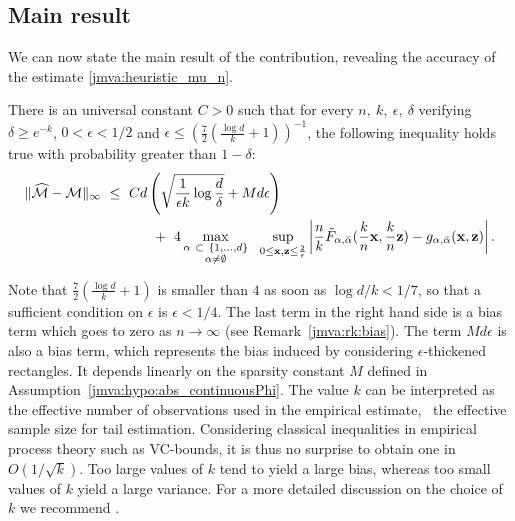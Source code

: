 \subsection{Main result}
We can now state the main result of the contribution, revealing the accuracy of the estimate \eqref{jmva:heuristic_mu_n}.
\begin{theorem}
\label{jmva:thm-princ}
There is an universal constant $C>0$ such that for every $n,~k,~\epsilon,~\delta$ verifying $\delta \ge e^{-k}$, $0 < \epsilon < 1/2$ and $ \epsilon \le (\frac{7}{2}(\frac{\log d}{k} + 1))^{-1}$,
the following inequality holds true with probability greater than $1-\delta$:
\begin{align*}
 \|\widehat{\mathcal{M}} - \cal{M}\|_\infty 
&~\le~  C d \left( \sqrt{ \frac{1}{\epsilon k}\log\frac{d}{\delta}} + M d\epsilon \right) \\
&~~~~~~~~~~~+~ 4 \max_{\substack{\alpha ~\subset~ \{1,\ldots,d\}\\ \alpha \neq \emptyset}}~~\sup_{0 \le \mathbf x, \mathbf z \le \frac{2 }{\epsilon}}\left|\frac{n}{k} \tilde F_{\alpha, \bar \alpha }( \frac{k}{n} \mathbf x, \frac{k}{n} \mathbf z)- g_{\alpha, \bar \alpha }(\mathbf x, \mathbf z)\right|.
\end{align*}
\end{theorem}
\noindent
Note that $\frac{7}{2}(\frac{\log d}{k} + 1)$ is smaller than $4$ as soon as $\log d / k < 1/7$, so that a sufficient condition on $\epsilon$ is $\epsilon < 1/4$.
The last term in the right hand side is a bias term which goes to zero as $n \to \infty$ (see Remark~\ref{jmva:rk:bias}).
The term $M d \epsilon$ is also a bias term, which represents the bias induced by considering $\epsilon$-thickened rectangles. It depends linearly on the sparsity constant $M$ defined in Assumption~\ref{jmva:hypo:abs_continuousPhi}. %
The value $k$ can be interpreted as the effective number of observations  used in the empirical estimate, \ie~the effective sample size for tail estimation. 
Considering classical inequalities in empirical process theory such as
VC-bounds, it is thus no surprise to obtain one  in $O(1/\sqrt k)$.
Too large values of $k$ tend to yield a large bias, whereas too small values of $k$ yield a large variance. For a more detailed discussion on the choice of $k$ we recommend \cite{ELL2009}. 



